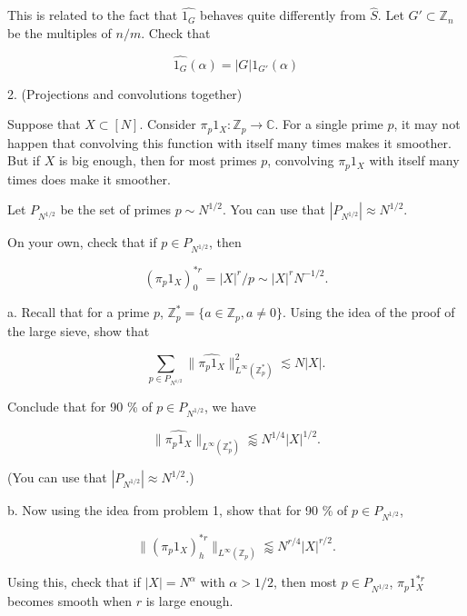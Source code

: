 \documentclass{amsart}
\newcommand{\CC}{\mathbb{C}}
\newcommand{\ZZ}{\mathbb{Z}}
\begin{document}
This is related to the fact that $\widehat{ 1_G}$ behaves quite differently from $\hat S$.    Let $G' \subset \ZZ_n$ be the multiples of $n/m$.  Check that

$$ \widehat{ 1_G}(\alpha) = |G| 1_{G'}(\alpha) $$


\vskip20pt

2.  (Projections and convolutions together)  

Suppose that $X \subset [N]$.   Consider $\pi_p 1_X: \ZZ_p \rightarrow \CC$.    For a single prime $p$,  it may not happen that convolving this function with itself many times makes it smoother.   But if $X$ is big enough,  then for most primes $p$,  convolving $\pi_p 1_X$ with itself many times does make it smoother.  

Let $P_{N^{1/2}}$ be the set of primes $p \sim N^{1/2}$.   You can use that $|P_{N^{1/2}}| \approx N^{1/2}$.  

\vskip5pt

On your own,  check that if $p \in P_{N^{1/2}}$,  then

\begin{equation} \label{low} (\pi_p 1_X)^{*r}_0 = |X|^r / p \sim |X|^r N^{-1/2}. \end{equation}

\vskip5pt

a.  Recall that for a prime $p$,  $\ZZ_p^* = \{ a \in \ZZ_p,  a \not= 0 \}$.   Using the idea of the proof of the large sieve,  show that

$$ \sum_{p \in P_{N^{1/2}}} \| \widehat{ \pi_p 1_X} \|_{L^\infty(\ZZ_p^*)}^2 \lesssim N |X|. $$

Conclude that for 90 \% of $p \in P_{N^{1/2}}$,  we have

$$ \| \widehat{ \pi_p 1_X} \|_{L^\infty(\ZZ_p^*)} \lessapprox N^{1/4} |X|^{1/2}. $$

(You can use that $|P_{N^{1/2}}| \approx N^{1/2}$.)

\vskip5pt

b.  Now using the idea from problem 1,  show that for 90 \% of $p \in P_{N^{1/2}}$, 

\begin{equation} \label{high1}
 \| (\pi_p 1_X)^{*r}_h \|_{L^\infty(\ZZ_p)} \lessapprox N^{r/4} |X|^{r/2}.
\end{equation}

Using this,  check that if $|X| = N^\alpha$ with $\alpha > 1/2$,  then most $p \in P_{N^{1/2}}$,  $\pi_p 1_X^{*r}$ becomes smooth when $r$ is large enough.
\end{document}
